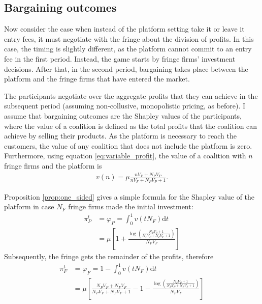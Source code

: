 \documentclass[a4paper]{article}
\newcommand{\dt}{\mathrm{d}t}
\begin{document}
\subsection{Bargaining outcomes}

Now consider the case when instead of the platform setting take it or leave it entry fees, it must negotiate with the fringe about the division of profits.
In this case, the timing is slightly different, as the platform cannot commit to an entry fee in the first period.
Instead, the game starts by fringe firms' investment decisions.
After that, in the second period, bargaining takes place between the platform and the fringe firms that have entered the market.


The participants negotiate over the aggregate profits that they can achieve in the subsequent period (assuming non-collusive, monopolistic pricing, as before).
I assume that bargaining outcomes are the Shapley values of the participants, where the value of a coalition is defined as the total profits that the coalition can achieve by selling their products.
As the platform is necessary to reach the customers, the value of any coalition that does not include the platform is zero.
Furthermore, using equation \eqref{eq:variable_profit}, the value of a coalition with $n$ fringe firms and the platform is
\begin{align*}
    v(n) = \mu \frac{n V_F + N_P V_P}{n V_F + N_P V_P + 1}.
\end{align*}

Proposition \ref{prop:one_sided} gives a simple formula for the Shapley value of the platform in case $N_F$ fringe firms made the initial investment:
\begin{align*}
    \pi^t_P &= \varphi_P = \int_0^1 v(tN_F) \dt \\
            &= \mu \left[ 1 + \frac{\log \left( \frac{N_P V_P + 1}{N_P V_P + N_F V_F + 1} \right)}{N_F V_F} \right]
\end{align*}
Subsequently, the fringe gets the remainder of the profits, therefore
\begin{align*}
    \pi^t_F &= \varphi_F =  1 - \int_0^1 v(tN_F) \dt \\
            &= \mu \left[ \frac{N_P V_P + N_F V_F}{N_P V_P + N_F V_F + 1} - 1 - \frac{\log \left( \frac{N_P V_P + 1}{N_P V_P + N_F V_F + 1} \right)}{N_F V_F} \right]
\end{align*}

\end{document}
